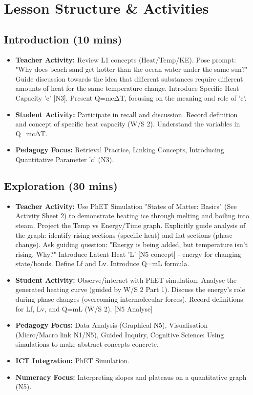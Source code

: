 \documentclass[11pt, a4paper]{article}
\begin{document}
\section*{Lesson Structure \& Activities}

\subsection*{Introduction (10 mins)}
\begin{itemize}
    \item \textbf{Teacher Activity:} Review L1 concepts (Heat/Temp/KE). Pose prompt: "Why does beach sand get hotter than the ocean water under the same sun?" Guide discussion towards the idea that different substances require different amounts of heat for the same temperature change. Introduce Specific Heat Capacity 'c' [N3]. Present Q=mcΔT, focusing on the meaning and role of 'c'.
    \item \textbf{Student Activity:} Participate in recall and discussion. Record definition and concept of specific heat capacity (W/S 2). Understand the variables in Q=mcΔT.
    \item \textbf{Pedagogy Focus:} Retrieval Practice, Linking Concepts, Introducing Quantitative Parameter 'c' (N3).
\end{itemize}

\subsection*{Exploration (30 mins)}
\begin{itemize}
    \item \textbf{Teacher Activity:} Use PhET Simulation "States of Matter: Basics" (See Activity Sheet 2) to demonstrate heating ice through melting and boiling into steam. Project the Temp vs Energy/Time graph. Explicitly guide analysis of the graph: identify rising sections (specific heat) and flat sections (phase change). Ask guiding question: "Energy is being added, but temperature isn't rising. Why?" Introduce Latent Heat 'L' [N5 concept] - energy for changing state/bonds. Define Lf and Lv. Introduce Q=mL formula.
    \item \textbf{Student Activity:} Observe/interact with PhET simulation. Analyse the generated heating curve (guided by W/S 2 Part 1). Discuss the energy's role during phase changes (overcoming intermolecular forces). Record definitions for Lf, Lv, and Q=mL (W/S 2). [N5 Analyse]
    \item \textbf{Pedagogy Focus:} Data Analysis (Graphical N5), Visualisation (Micro/Macro link N1/N5), Guided Inquiry, Cognitive Science: Using simulations to make abstract concepts concrete.
    \item \textbf{ICT Integration:} PhET Simulation.
    \item \textbf{Numeracy Focus:} Interpreting slopes and plateaus on a quantitative graph (N5).
\end{itemize}
\end{document}
